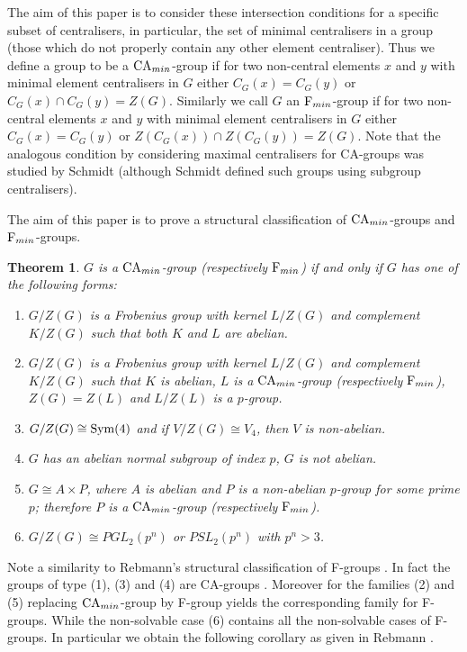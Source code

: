 \documentclass[a4paper,11pt]{article}
\theoremstyle{plain}
\newtheorem{thm}{Theorem}[section]
\numberwithin{thm}{section}
\begin{document}
The aim of this paper is to consider these intersection conditions for a specific subset of centralisers, in particular, the set of minimal centralisers in a group (those which do not properly contain any other element centraliser).
Thus we define a group to be a ${\rm CA}_{min}$-group if for two non-central elements $x$ and $y$ with minimal element centralisers in $G$ either $C_G(x)=C_G(y)$ or $C_G(x)\cap C_G(y)=Z(G)$.
Similarly we call $G$ an ${\rm F}_{min}$-group if for two non-central elements $x$ and $y$ with minimal element centralisers in $G$ either $C_G(x)=C_G(y)$ or $Z(C_G(x))\cap Z(C_G(y))=Z(G)$.
Note that the analogous condition by considering maximal centralisers for CA-groups was studied by Schmidt \cite{SchmidtCaGps} (although Schmidt defined such groups using subgroup centralisers).

 
The aim of this paper is to prove a structural classification of ${\rm CA}_{min}$-groups and ${\rm F}_{min}$-groups.

\begin{thm}\label{MainThm}
$G$ is a ${\rm CA}_{min}$-group {\rm (respectively ${\rm F}_{min}$)} if and only if $G$ has one of the following forms:
\begin{enumerate}
\item $G/Z(G)$ is a Frobenius group with kernel $L/Z(G)$ and complement $K/Z(G)$ such that both $K$ and $L$ are abelian.
\item $G/Z(G)$ is a Frobenius group with kernel $L/Z(G)$ and complement $K/Z(G)$ such that $K$ is abelian, $L$ is a ${\rm CA}_{min}$-group {\rm (respectively ${\rm F}_{min}$)}, $Z(G)=Z(L)$ and $L/Z(L)$ is a $p$-group.
\item $G/Z(G)\cong {\rm Sym}(4)$ and if $V/Z(G)\cong V_4$, then $V$ is non-abelian. 
\item $G$ has an abelian normal subgroup of index $p$, $G$ is not abelian.
\item $G\cong A\times P$, where $A$ is abelian and $P$ is a non-abelian $p$-group for some prime $p$; therefore $P$ is a ${\rm CA}_{min}$-group {\rm (respectively ${\rm F}_{min}$)}.
\item $G/Z(G)\cong PGL_2(p^n)$ or $PSL_2(p^n)$ with $p^n > 3$.
\end{enumerate}
\end{thm}

Note a similarity to Rebmann's structural classification of F-groups \cite{FGroups}.
In fact the groups of type (1), (3) and (4) are CA-groups \cite{SchmidtCaGps}.
Moreover for the families (2) and (5) replacing ${\rm CA}_{min}$-group by F-group yields the corresponding family for F-groups.
While the non-solvable case (6) contains all the non-solvable cases of F-groups.
In particular we obtain the following corollary as given in Rebmann \cite{FGroups}.
\end{document}
